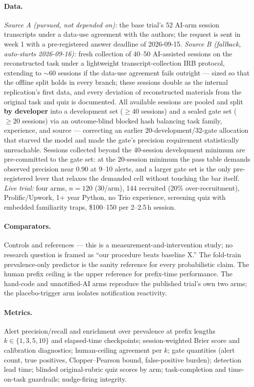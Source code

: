 \documentclass[11pt]{article}
\begin{document}
\paragraph{Data.}
\emph{Source A (pursued, not depended on):} the base trial's 52 AI-arm session transcripts under a data-use agreement with the authors; the request is sent in week 1 with a pre-registered answer deadline of 2026-09-15. \emph{Source B (fallback, auto-starts 2026-09-16):} fresh collection of 40--50 AI-assisted sessions on the reconstructed task under a lightweight transcript-collection IRB protocol, extending to ${\sim}60$ sessions if the data-use agreement fails outright --- sized so that the offline split holds in every branch; these sessions double as the internal replication's first data, and every deviation of reconstructed materials from the original task and quiz is documented. All available sessions are pooled and split \textbf{by developer} into a development set ($\geq 40$ sessions) and a sealed gate set ($\geq 20$ sessions) via an outcome-blind blocked hash balancing task family, experience, and source --- correcting an earlier 20-development/32-gate allocation that starved the model and made the gate's precision requirement statistically unreachable. Sessions collected beyond the 40-session development minimum are pre-committed to the gate set: at the 20-session minimum the pass table demands observed precision near 0.90 at 9--10 alerts, and a larger gate set is the only pre-registered lever that relaxes the demanded cell without touching the bar itself. \emph{Live trial:} four arms, $n = 120$ (30/arm), 144 recruited (20\% over-recruitment), Prolific/Upwork, 1+ year Python, no Trio experience, screening quiz with embedded familiarity traps, \$100--150 per 2--2.5\,h session.

\paragraph{Comparators.}
Controls and references --- this is a measurement-and-intervention study; no research question is framed as ``our procedure beats baseline X.'' The fold-train prevalence-only predictor is the sanity reference for every probabilistic claim. The human prefix ceiling is the upper reference for prefix-time performance. The hand-code and unnotified-AI arms reproduce the published trial's own two arms; the placebo-trigger arm isolates notification reactivity.

\paragraph{Metrics.}
Alert precision/recall and enrichment over prevalence at prefix lengths $k \in \{1,3,5,10\}$ and elapsed-time checkpoints; session-weighted Brier score and calibration diagnostics; human-ceiling agreement per $k$; gate quantities (alert count, true positives, Clopper--Pearson bound, false-positive burden); detection lead time; blinded original-rubric quiz scores by arm; task-completion and time-on-task guardrails; nudge-firing integrity.
\end{document}
